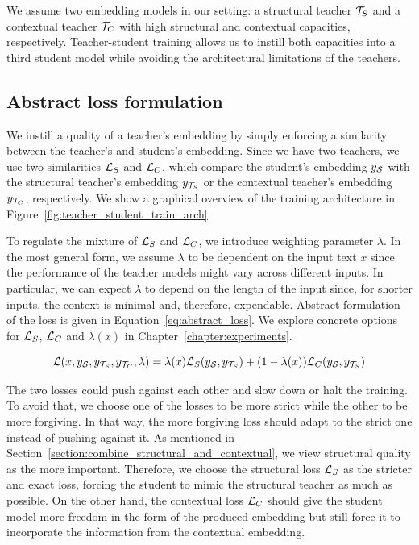 We assume two embedding models in our setting: a structural teacher
$\mathcal{T}_S$ and a contextual teacher $\mathcal{T}_C$ with high structural and
contextual capacities, respectively. Teacher-student training allows us to
instill both capacities into a third student model {\Student} while avoiding
the architectural limitations of the teachers.


\subsection{Abstract loss formulation}\label{section:abstract_loss}


We instill a quality of a teacher's embedding by simply enforcing a similarity
between the teacher's and student's embedding. Since we have two teachers, we
use two similarities $\mathcal{L}_S$ and $\mathcal{L}_C$, which compare the student's
embedding $y_{\mathcal{S}}$ with the structural teacher's embedding $y_{\mathcal{T}_S}$
or the contextual teacher's embedding $y_{\mathcal{T}_C}$, respectively. We show
a graphical overview of the training architecture in
Figure~\ref{fig:teacher_student_train_arch}.

To regulate the mixture of $\mathcal{L}_S$ and $\mathcal{L}_C$, we introduce weighting
parameter $\lambda$. In the most general form, we assume $\lambda$ to be
dependent on the input text $x$ since the performance of the teacher models
might vary across different inputs. In particular, we can expect $\lambda$ to
depend on the length of the input since, for shorter inputs, the context
is minimal and, therefore, expendable. Abstract formulation of the loss is
given in Equation~\ref{eq:abstract_loss}. We explore concrete options for
$\mathcal{L}_S$, $\mathcal{L}_C$ and $\lambda(x)$ in Chapter~\ref{chapter:experiments}.

\begin{equation}\label{eq:abstract_loss}
  \mathcal{L}(
    x,
    y_{\mathcal{S}},
    y_{\mathcal{T}_S},
    y_{\mathcal{T}_C},
    \lambda
  ) =
    \lambda(x) \mathcal{L}_S(y_{\mathcal{S}}, y_{\mathcal{T}_S}) +
            (1 - \lambda(x)) \mathcal{L}_C(y_{\mathcal{S}}, y_{\mathcal{T}_S})
\end{equation}

The two losses could push against each other and slow down or halt the
training. To avoid that, we choose one of the losses to be more strict while
the other to be more forgiving. In that way, the more forgiving loss should
adapt to the strict one instead of pushing against it. As mentioned in
Section~\ref{section:combine_structural_and_contextual}, we view structural
quality as the more important. Therefore, we choose the structural loss $\mathcal{L}_S$ as the stricter and exact loss, forcing the student to mimic the
structural teacher as much as possible. On the other hand, the contextual loss
$\mathcal{L}_C$ should give the student model more freedom in the form of the
produced embedding but still force it to incorporate the information from the
contextual embedding.

